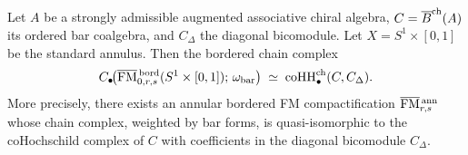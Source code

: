 \begin{theorem}
\label{thm:bordered-annular}
Let $A$ be a strongly admissible augmented associative chiral algebra,
$C = \overline{B}^{\mathrm{ch}}(A)$ its ordered bar coalgebra, and
$C_\Delta$ the diagonal bicomodule.
Let $X = S^1 \times [0,1]$ be the standard annulus.
Then the bordered chain complex
\[
C_\bullet\!\bigl(
\overline{\mathrm{FM}}{}^{\,\mathrm{bord}}_{0,r,s}(S^1\times[0,1]);\,
\omega_{\mathrm{bar}}
\bigr)
\;\simeq\;
\operatorname{coHH}^{\mathrm{ch}}_\bullet(C,C_\Delta).
\]
More precisely, there exists an annular bordered FM compactification
$\overline{\mathrm{FM}}{}^{\,\mathrm{ann}}_{r,s}$ whose chain complex,
weighted by bar forms, is quasi-isomorphic to the coHochschild complex
of $C$ with coefficients in the diagonal bicomodule $C_\Delta$.
\end{theorem}

